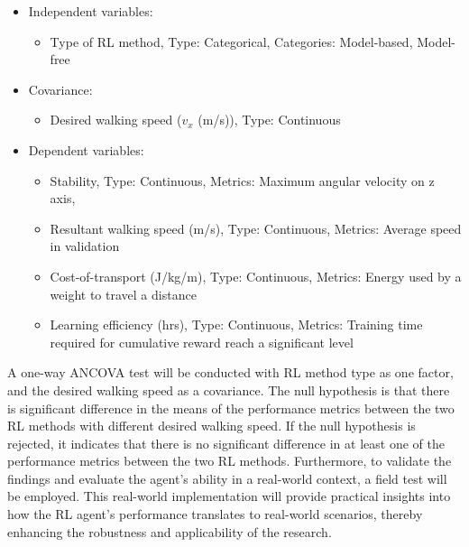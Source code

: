 \begin{itemize}
    \item Independent variables: 
    \begin{itemize}
        \item Type of RL method, Type: Categorical, Categories: Model-based, Model-free
    \end{itemize}
    \item Covariance:
    \begin{itemize}
        \item Desired walking speed ($v_x$ (m/s)), Type: Continuous
    \end{itemize}
    \item Dependent variables:
    \begin{itemize}
        \item Stability, Type: Continuous, Metrics: Maximum angular velocity on z axis, 
        \item Resultant walking speed (m/s), Type: Continuous, Metrics: Average speed in validation
        \item Cost-of-transport (J/kg/m), Type: Continuous, Metrics: Energy used by a weight to travel a distance
        \item Learning efficiency (hrs), Type: Continuous, Metrics: Training time required for cumulative reward reach a significant level
    \end{itemize}
\end{itemize}
A one-way \ac{ANCOVA} test will be conducted with \ac{RL} method type as one factor, and the desired walking speed as a covariance. The null hypothesis is that there is significant difference in the means of the performance metrics between the two RL methods with different desired walking speed. If the null hypothesis is rejected, it indicates that there is no significant difference in at least one of the performance metrics between the two RL methods. Furthermore, to validate the findings and evaluate the agent's ability in a real-world context, a field test will be employed. This real-world implementation will provide practical insights into how the RL agent's performance translates to real-world scenarios, thereby enhancing the robustness and applicability of the research. 

